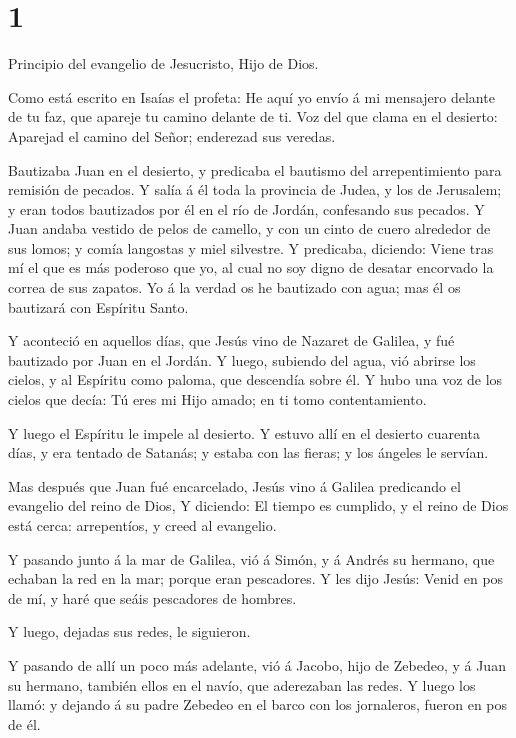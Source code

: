 \hypertarget{section}{%
\section{1}\label{section}}

 Principio del evangelio de Jesucristo, Hijo de Dios.

 Como está escrito en Isaías el profeta: He aquí yo envío á
mi mensajero delante de tu faz, que apareje tu camino delante de ti.
 Voz del que clama en el desierto: Aparejad el camino del
Señor; enderezad sus veredas.

 Bautizaba Juan en el desierto, y predicaba el bautismo del
arrepentimiento para remisión de pecados.  Y salía á él toda
la provincia de Judea, y los de Jerusalem; y eran todos bautizados por
él en el río de Jordán, confesando sus pecados.  Y Juan
andaba vestido de pelos de camello, y con un cinto de cuero alrededor de
sus lomos; y comía langostas y miel silvestre.  Y predicaba,
diciendo: Viene tras mí el que es más poderoso que yo, al cual no soy
digno de desatar encorvado la correa de sus zapatos.  Yo á
la verdad os he bautizado con agua; mas él os bautizará con Espíritu
Santo.

 Y aconteció en aquellos días, que Jesús vino de Nazaret de
Galilea, y fué bautizado por Juan en el Jordán.  Y luego,
subiendo del agua, vió abrirse los cielos, y al Espíritu como paloma,
que descendía sobre él.  Y hubo una voz de los cielos que
decía: Tú eres mi Hijo amado; en ti tomo contentamiento.

 Y luego el Espíritu le impele al desierto.  Y
estuvo allí en el desierto cuarenta días, y era tentado de Satanás; y
estaba con las fieras; y los ángeles le servían.

 Mas después que Juan fué encarcelado, Jesús vino á Galilea
predicando el evangelio del reino de Dios,  Y diciendo: El
tiempo es cumplido, y el reino de Dios está cerca: arrepentíos, y creed
al evangelio.

 Y pasando junto á la mar de Galilea, vió á Simón, y á
Andrés su hermano, que echaban la red en la mar; porque eran pescadores.
 Y les dijo Jesús: Venid en pos de mí, y haré que seáis
pescadores de hombres.

 Y luego, dejadas sus redes, le siguieron.

 Y pasando de allí un poco más adelante, vió á Jacobo, hijo
de Zebedeo, y á Juan su hermano, también ellos en el navío, que
aderezaban las redes.  Y luego los llamó: y dejando á su
padre Zebedeo en el barco con los jornaleros, fueron en pos de él.

